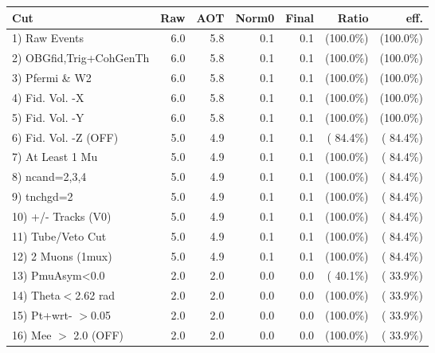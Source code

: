  \begin{table}[h!]\centering
 \begin{tabular}{||l||r|r|r|r|r|r||}
 \hline
 \hline
 Cut & Raw & AOT & Norm0 & Final & Ratio & eff.       \\
 \hline
  1) Raw Events           &          6.0 &          5.8 &          0.1 &          0.1 & (100.0\%) & (100.0\%) \\
  2) OBGfid,Trig+CohGenTh &          6.0 &          5.8 &          0.1 &          0.1 & (100.0\%) & (100.0\%) \\
  3) Pfermi \& W2         &          6.0 &          5.8 &          0.1 &          0.1 & (100.0\%) & (100.0\%) \\
  4) Fid. Vol. -X         &          6.0 &          5.8 &          0.1 &          0.1 & (100.0\%) & (100.0\%) \\
  5) Fid. Vol. -Y         &          6.0 &          5.8 &          0.1 &          0.1 & (100.0\%) & (100.0\%) \\
  6) Fid. Vol. -Z (OFF)   &          5.0 &          4.9 &          0.1 &          0.1 & ( 84.4\%) & ( 84.4\%) \\
  7) At Least 1 Mu        &          5.0 &          4.9 &          0.1 &          0.1 & (100.0\%) & ( 84.4\%) \\
  8) ncand=2,3,4          &          5.0 &          4.9 &          0.1 &          0.1 & (100.0\%) & ( 84.4\%) \\
  9) tnchgd=2             &          5.0 &          4.9 &          0.1 &          0.1 & (100.0\%) & ( 84.4\%) \\
 10) +/- Tracks (V0)      &          5.0 &          4.9 &          0.1 &          0.1 & (100.0\%) & ( 84.4\%) \\
 11) Tube/Veto Cut        &          5.0 &          4.9 &          0.1 &          0.1 & (100.0\%) & ( 84.4\%) \\
 12) 2 Muons (1mux)       &          5.0 &          4.9 &          0.1 &          0.1 & (100.0\%) & ( 84.4\%) \\
 13) PmuAsym<0.0          &          2.0 &          2.0 &          0.0 &          0.0 & ( 40.1\%) & ( 33.9\%) \\
 14) Theta$<$2.62 rad     &          2.0 &          2.0 &          0.0 &          0.0 & (100.0\%) & ( 33.9\%) \\
 15) Pt+wrt- $>$0.05      &          2.0 &          2.0 &          0.0 &          0.0 & (100.0\%) & ( 33.9\%) \\
 16) Mee $>$ 2.0  (OFF)   &          2.0 &          2.0 &          0.0 &          0.0 & (100.0\%) & ( 33.9\%) \\

\end{tabular}
\end{table}
